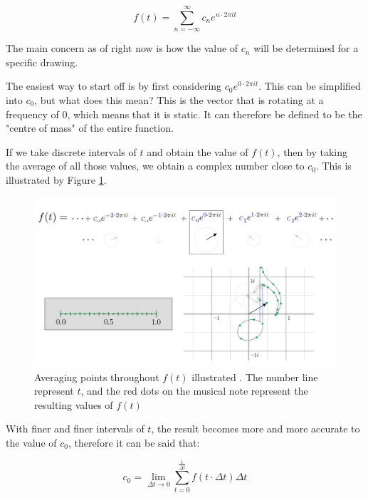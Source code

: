 \documentclass[letterpaper, 12pt]{article}
\begin{document}
\begin{equation}
    f(t) = \sum_{n=-\infty}^{\infty} c_n e^{n \cdot 2\pi it}
    \label{eq:ft_def}
\end{equation}

The main concern as of right now is how the value of \(c_n\) will be determined
for a specific drawing.

The easiest way to start off is by first considering \(c_0 e^{0 \cdot 2\pi it}\).
This can be simplified into \(c_0\), but what does this mean?
This is the vector that is rotating at a frequency of 0, which means that
it is static. It can therefore be defined to be the "centre of mass"\cite{sandersonWhatFourierSeries2019}
of the entire function.

If we take discrete intervals of \(t\) and obtain the value of \(f(t)\),
then by taking the average of all those values, we obtain a complex number
close to \(c_0\). This is illustrated by Figure \ref{fig:cnot_integ}.

\begin{figure}[H]
    \centering
    \includegraphics[width=\textwidth]{cnot_integ.jpeg}
    \caption{Averaging points throughout \protect\(f(t)\) illustrated \protect\cite{sandersonWhatFourierSeries2019}. The number line represent \protect\(t\), and the red dots on the musical note represent the resulting values of \protect\(f(t)\)}
    \label{fig:cnot_integ}
\end{figure}

With finer and finer intervals of \(t\), the result
becomes more and more accurate to the value of \(c_0\), therefore it can be
said that:

\begin{equation}
    c_0 = \lim_{\Delta t \to 0} \sum_{t = 0}^{\frac{1}{\Delta t}} f(t \cdot \Delta t) \Delta t
    \label{eq:cnot_lim}
\end{equation}
\end{document}
